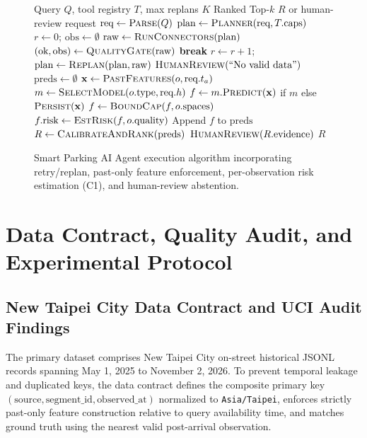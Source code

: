 \documentclass[conference,a4paper]{IEEEtran}
\begin{document}
\begin{figure}[!t]
\centering
\begin{minipage}{0.96\columnwidth}
\footnotesize
\begin{algorithmic}[1]
\REQUIRE Query $Q$, tool registry $T$, max replans $K$
\ENSURE Ranked Top-$k$ $R$ or human-review request
\STATE $\text{req} \leftarrow \textsc{Parse}(Q)$
\STATE $\text{plan} \leftarrow \textsc{Planner}(\text{req}, T.\text{caps})$
\STATE $r \leftarrow 0$; $\text{obs} \leftarrow \emptyset$
    \STATE $\text{raw} \leftarrow \textsc{RunConnectors}(\text{plan})$
    \STATE $(\text{ok}, \text{obs}) \leftarrow \textsc{QualityGate}(\text{raw})$
        \STATE \textbf{break}
    \ENDIF
    \STATE $r \leftarrow r + 1$; $\text{plan} \leftarrow \textsc{Replan}(\text{plan}, \text{raw})$
\ENDWHILE
{}
    \RETURN $\textsc{HumanReview}(\text{``No valid data''})$
\ENDIF
\STATE $\text{preds} \leftarrow \emptyset$
    \STATE $\mathbf{x} \leftarrow \textsc{PastFeatures}(o, \text{req}.t_a)$
    \STATE $m \leftarrow \textsc{SelectModel}(o.\text{type}, \text{req}.h)$
    \STATE $f \leftarrow m.\textsc{Predict}(\mathbf{x})$ if $m$ else $\textsc{Persist}(\mathbf{x})$
    \STATE $f \leftarrow \textsc{BoundCap}(f, o.\text{spaces})$
    \STATE $f.\text{risk} \leftarrow \textsc{EstRisk}(f, o.\text{quality})$ 
    \STATE Append $f$ to $\text{preds}$
\ENDFOR
\STATE $R \leftarrow \textsc{CalibrateAndRank}(\text{preds})$
    \RETURN $\textsc{HumanReview}(R.\text{evidence})$
\ENDIF
\RETURN $R$
\end{algorithmic}
\end{minipage}
\caption{Smart Parking AI Agent execution algorithm incorporating retry/replan, past-only feature enforcement, per-observation risk estimation (C1), and human-review abstention.}
\label{fig:algorithm}
\end{figure}

\section{Data Contract, Quality Audit, and Experimental Protocol}\label{sec:data}

\subsection{New Taipei City Data Contract and UCI Audit Findings}
The primary dataset comprises New Taipei City on-street historical JSONL records spanning May 1, 2025 to November 2, 2026. To prevent temporal leakage and duplicated keys, the data contract defines the composite primary key $(\text{source}, \text{segment\_id}, \text{observed\_at})$ normalized to \texttt{Asia/Taipei}, enforces strictly past-only feature construction relative to query availability time, and matches ground truth using the nearest valid post-arrival observation.
\end{document}
